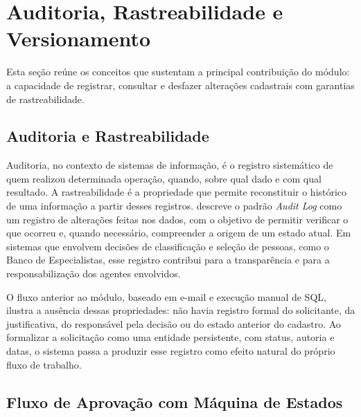 \section{Auditoria, Rastreabilidade e Versionamento}
\label{sec:auditoria-rastreabilidade-versionamento}

Esta seção reúne os conceitos que sustentam a principal contribuição do módulo: a capacidade
de registrar, consultar e desfazer alterações cadastrais com garantias de rastreabilidade.

\subsection{Auditoria e Rastreabilidade}
\label{subsec:auditoria-rastreabilidade}

Auditoria, no contexto de sistemas de informação, é o registro sistemático de quem realizou
determinada operação, quando, sobre qual dado e com qual resultado. A rastreabilidade é a
propriedade que permite reconstituir o histórico de uma informação a partir desses registros.
 descreve o padrão \textit{Audit Log} como um registro de alterações
feitas nos dados, com o objetivo de permitir verificar o que ocorreu e, quando necessário,
compreender a origem de um estado atual. Em sistemas que envolvem decisões de classificação e
seleção de pessoas, como o Banco de Especialistas, esse registro contribui para a transparência
e para a responsabilização dos agentes envolvidos.

O fluxo anterior ao módulo, baseado em e-mail e execução manual de SQL, ilustra a ausência
dessas propriedades: não havia registro formal do solicitante, da justificativa, do responsável
pela decisão ou do estado anterior do cadastro. Ao formalizar a solicitação como uma entidade
persistente, com status, autoria e datas, o sistema passa a produzir esse registro como efeito
natural do próprio fluxo de trabalho.



\subsection{Fluxo de Aprovação com Máquina de Estados}
\label{subsec:fluxo-aprovacao-maquina-estados}

